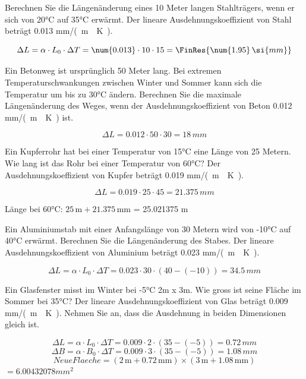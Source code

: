 \begin{questions}
\question Berechnen Sie die Längenänderung eines 10 Meter langen Stahlträgers, wenn er sich von 20°C auf 35°C erwärmt. Der lineare Ausdehnungskoeffizient von Stahl beträgt \num{0.013} \si{mm/(m\cdot K)}.
\begin{solution}
    \[ \Delta L = \alpha \cdot L_0 \cdot \Delta T = \num{0.013} \cdot 10 \cdot 15 = \FinRes{\num{1.95} \, \si{mm}} \]
\end{solution}

\question Ein Betonweg ist ursprünglich 50 Meter lang. Bei extremen Temperaturschwankungen zwischen Winter und Sommer kann sich die Temperatur um bis zu 30°C ändern. Berechnen Sie die maximale Längenänderung des Weges, wenn der Ausdehnungskoeffizient von Beton \num{0.012} \si{mm/(m\cdot K)} ist.
\begin{solution}
    \[ \Delta L = \num{0.012} \cdot 50 \cdot 30 = \num{18} \, \si{mm} \]
\end{solution}

\question Ein Kupferrohr hat bei einer Temperatur von 15°C eine Länge von 25 Metern. Wie lang ist das Rohr bei einer Temperatur von 60°C? Der Ausdehnungskoeffizient von Kupfer beträgt \num{0.019} \si{mm/(m\cdot K)}.
\begin{solution}
    \[ \Delta L = \num{0.019} \cdot 25 \cdot 45 = \num{21.375} \, \si{mm} \]

    Länge bei 60°C: $25 \, \text{m} + 21.375 \, \text{mm}$  = \num{25.021375} \si{m}
\end{solution}


\question Ein Aluminiumstab mit einer Anfangslänge von 30 Metern wird von -10°C auf 40°C erwärmt. Berechnen Sie die Längenänderung des Stabes. Der lineare Ausdehnungskoeffizient von Aluminium beträgt \num{0.023} \si{mm/(m\cdot K)}.
\begin{solution}
    \[ \Delta L = \alpha \cdot L_0 \cdot \Delta T = \num{0.023} \cdot 30 \cdot (40 - (-10)) = \num{34.5} \, \si{mm} \]
\end{solution}

\pagebreaksol
\question Ein Glasfenster misst im Winter bei -5°C 2m x 3m. Wie gross ist seine Fläche im Sommer bei 35°C? Der lineare Ausdehnungskoeffizient von Glas beträgt \num{0.009} \si{mm/(m\cdot K)}. Nehmen Sie an, dass die Ausdehnung in beiden Dimensionen gleich ist.
\begin{solution}
    \[ \Delta L = \alpha \cdot L_0 \cdot \Delta T = \num{0.009} \cdot 2 \cdot (35 - (-5)) = \num{0.72} \, \si{mm} \]
    \[ \Delta B = \alpha \cdot B_0 \cdot \Delta T = \num{0.009} \cdot 3 \cdot (35 - (-5)) = \num{1.08} \, \si{mm} \]
    \[ Neue Flaeche = (2 \, \text{m} + 0.72 \, \text{mm}) \times (3 \, \text{m} + 1.08 \, \text{mm}) \] $= \num{6.00432078} \si{mm^2}$
\end{solution}


\end{questions}
